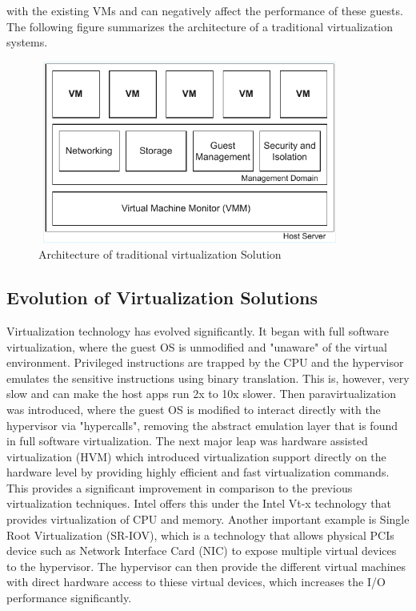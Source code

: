 with the existing VMs and can negatively affect the performance of these guests. 
The following figure summarizes the architecture of a traditional virtualization systems. 
\begin{figure}[H]
  \centering
  \includegraphics[width=10cm, height=6cm]{figures/traditional_hypervisor.pdf}
  \caption{Architecture of traditional virtualization Solution}
  \label{fig:hyper}
\end{figure}

\subsection{Evolution of Virtualization Solutions}
Virtualization technology has evolved significantly. It began with full software virtualization, where the guest OS is unmodified and "unaware" of the virtual environment. Privileged instructions 
are trapped by the CPU and the hypervisor emulates the sensitive instructions using binary translation. This is, however, very slow and can make the host apps run 2x to 10x slower. Then paravirtualization was introduced, where the guest OS is modified to interact directly with the hypervisor via "hypercalls", removing the abstract emulation layer that is found in full software virtualization. 
The next major leap was hardware assisted virtualization (HVM) which introduced virtualization support directly on the hardware level by providing highly efficient and fast 
virtualization commands. This provides a significant improvement in comparison to the previous virtualization 
techniques. Intel offers this under the Intel Vt-x technology that provides virtualization of CPU and memory.
Another important example is Single Root Virtualization (SR-IOV), which is a technology that allows physical 
PCIs device such as Network Interface Card (NIC) to expose multiple virtual devices to the hypervisor. 
The hypervisor can then provide the different virtual machines with direct hardware access to thiese virtual 
devices, which increases the I/O performance significantly. 


